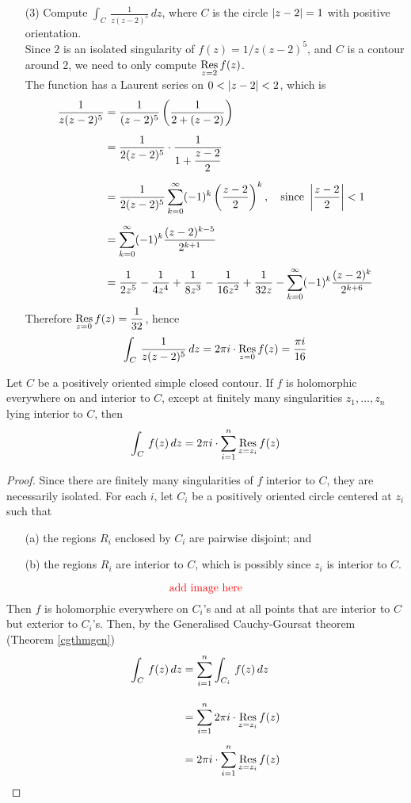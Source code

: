 \begin{example}
\begin{itemize}[itemsep=1em]
\item[(3)] Compute $\displaystyle \int_C\,\frac{1}{z(z-2)^5}\, dz$, where $C$ is the circle $\left\lvert z - 2\right\rvert = 1$ with positive orientation.\\[0.5em]
Since $2$ is an isolated singularity of $f(z) = 1/z(z-2)^5$, and $C$ is a contour around $2$, we need to only compute $\underset{z = {2}}{\operatorname{Res}}\,f(z)$.\\[0.5em]
The function has a Laurent series on $0 < \left\lvert z - 2\right\rvert < 2$, which is
\begin{align*}
\frac{1}{z(z-2)^5} &= \frac{1}{(z - 2)^5}\left(\frac{1}{2 + (z - 2)}\right)\\[0.5em]
 &= \frac{1}{2(z - 2)^5}\cdot\frac{1}{1 + \dfrac{z - 2}{2}}\\[0.5em]
 &= \frac{1}{2(z - 2)^5}\sum_{k=0}^\infty(-1)^k\left(\frac{z - 2}{2}\right)^k,\quad \text{since }\left\lvert\frac{z - 2}{2}\right\rvert < 1\\[0.5em]
 &= \sum_{k=0}^\infty(-1)^k\frac{(z - 2)^{k-5}}{2^{k+1}}\\[0.5em]
 &= \frac{1}{2z^5} - \frac{1}{4z^4} + \frac{1}{8z^3} - \frac{1}{16z^2} + \frac{1}{32z} - \sum_{k=0}^\infty(-1)^{k}\frac{(z - 2)^{k}}{2^{k+6}}
\end{align*}
Therefore $\underset{z = {0}}{\operatorname{Res}}\,f(z) = \dfrac{1}{32}$, hence 
\[\int_C\,\frac{1}{z(z-2)^5}\,dz = 2\pi i\cdot\underset{z = {0}}{\operatorname{Res}}\,f(z) = \frac{\pi i}{16}\]
\end{itemize}
\end{example}

\vspace*{1em}

\begin{theorem}\label{rescalc}
Let $C$ be a positively oriented simple closed contour. If $f$ is holomorphic everywhere on and interior to $C$, except at finitely many singularities $z_1,\ldots,z_n$ lying interior to $C$, then
\[\int_C\,f(z)\,dz = 2\pi i\cdot \sum_{i = 1}^n\underset{z = {z_i}}{\operatorname{Res}}\,f(z)\]
\end{theorem}
\begin{proof}
Since there are finitely many singularities of $f$ interior to $C$, they are necessarily isolated. For each $i$, let $C_i$ be a positively oriented circle centered at $z_i$ such that
\begin{itemize}
\item[(a)] the regions $R_i$ enclosed by $C_i$ are pairwise disjoint; and
\item[(b)] the regions $R_i$ are interior to $C$, which is possibly since $z_i$ is interior to $C$.
\end{itemize}
\[\text{\color{red}add image here}\]
Then $f$ is holomorphic everywhere on $C_i$'s and at all points that are interior to $C$ but exterior to $C_i$'s. Then, by the Generalised Cauchy-Goursat theorem (Theorem \ref{cgthmgen})
\begin{align*}
\int_C\,f(z)\,dz &= \sum_{i=1}^n\int_{C_i}\,f(z)\,dz\\[1em]
 &= \sum_{i=1}^n 2\pi i\cdot \underset{z = {z_i}}{\operatorname{Res}}\,f(z)\\[0.5em]
 &= 2\pi i\cdot \sum_{i = 1}^n\underset{z = {z_i}}{\operatorname{Res}}\,f(z)
\end{align*}
\end{proof}


